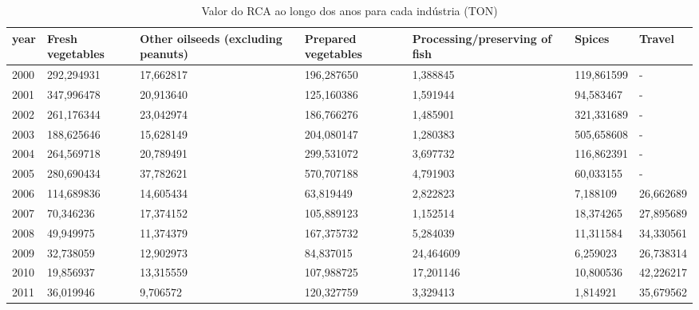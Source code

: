 \begin{table}
\centering
\caption{Valor do RCA ao longo dos anos para cada indústria (TON)}
\begin{tabular}{p{1cm}p{2cm}p{2cm}p{2cm}p{2cm}p{2cm}p{2cm}}
\toprule
 year &  Fresh vegetables &  Other oilseeds (excluding peanuts) &  Prepared vegetables &  Processing/preserving of fish &     Spices &    Travel \\
\midrule
 2000 &        292,294931 &                           17,662817 &           196,287650 &                       1,388845 & 119,861599 &         - \\
 2001 &        347,996478 &                           20,913640 &           125,160386 &                       1,591944 &  94,583467 &         - \\
 2002 &        261,176344 &                           23,042974 &           186,766276 &                       1,485901 & 321,331689 &         - \\
 2003 &        188,625646 &                           15,628149 &           204,080147 &                       1,280383 & 505,658608 &         - \\
 2004 &        264,569718 &                           20,789491 &           299,531072 &                       3,697732 & 116,862391 &         - \\
 2005 &        280,690434 &                           37,782621 &           570,707188 &                       4,791903 &  60,033155 &         - \\
 2006 &        114,689836 &                           14,605434 &            63,819449 &                       2,822823 &   7,188109 & 26,662689 \\
 2007 &         70,346236 &                           17,374152 &           105,889123 &                       1,152514 &  18,374265 & 27,895689 \\
 2008 &         49,949975 &                           11,374379 &           167,375732 &                       5,284039 &  11,311584 & 34,330561 \\
 2009 &         32,738059 &                           12,902973 &            84,837015 &                      24,464609 &   6,259023 & 26,738314 \\
 2010 &         19,856937 &                           13,315559 &           107,988725 &                      17,201146 &  10,800536 & 42,226217 \\
 2011 &         36,019946 &                            9,706572 &           120,327759 &                       3,329413 &   1,814921 & 35,679562 \\

\end{tabular}
\end{table}
